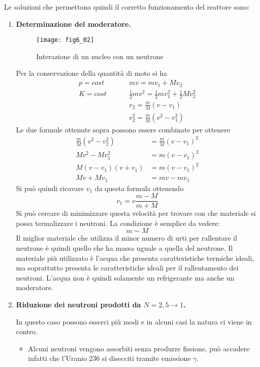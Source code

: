 Le soluzioni che permettono quindi il corretto funzionamento del reattore sono:
\begin{enumerate}
\item \textbf{Determinazione del moderatore.}
\begin{figure}[h]
\centering
\texttt{[image: fig6\_02]}
\caption{Interazione di un nucleo con un neutrone}
\end{figure}

Per la conservazione della quantità di moto si ha 
\begin{equation}
\begin{split}
p=cost\hspace{1cm}&mv=mv_1+Mv_2\\
K=cost\hspace{1cm}&\frac{1}{2}mv^2=\frac{1}{2}mv_1^2+\frac{1}{2}Mv_2^2\\
&v_2=\frac{m}{M}(v-v_1)\\
&v_2^2=\frac{m}{M}(v^2-v_1^2)
\end{split}
\end{equation}
Le due formule ottenute sopra possono essere combinate per ottenere 
\begin{equation}
\begin{split}
\frac{m}{M}(v^2-v_2^2)&=\frac{m}{M}(v-v_1)^2\\
Mv^2-Mv_1^2&=m(v-v_1)^2\\
M(v-v_1)(v+v_1)&=m(v-v_1)^2\\
Mv+Mv_1&=mv-mv_1
\end{split}
\end{equation}
Si può quindi ricavare $v_1$ da questa formula ottenendo
\begin{equation}
v_1=v\frac{m-M}{m+M}
\end{equation}
Si può cercare di minimizzare questa velocità per trovare con che materiale si possa termalizzare i neutroni.
La condizione è semplice da vedere:
\[
m\sim M
\]
Il miglior materiale che utilizza il minor numero di urti per rallentare il neutrone è quindi quello che ha massa uguale a quella del neutrone.
Il materiale più utilizzato è l'acqua che presenta caratteristiche termiche ideali, ma soprattutto presenta le caratteristiche ideali per il rallentamento dei neutroni.
L'acqua non è quindi solamente un refrigerante ma anche un moderatore.

\item \textbf{Riduzione dei neutroni prodotti da $N=2,5\to 1$.}

In questo caso possono esserci più modi e in alcuni casi la natura ci viene in contro.
\begin{itemize}
\item Alcuni neutroni vengono assorbiti senza produrre fissione, può accadere infatti che l'Uranio 236 si disecciti tramite emissione $\gamma$.


\end{itemize}
\end{enumerate}
